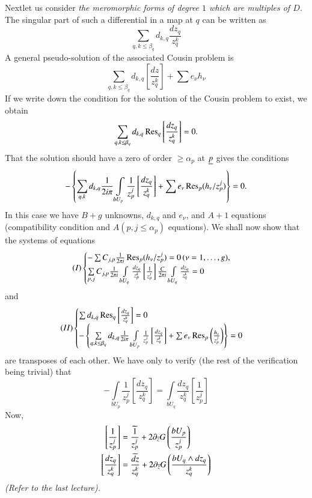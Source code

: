 Next\pageoriginale let us consider {\em the meromorphic forms of
  degree $1$ which are multiples of $D$.} The singular part of such a
differential in a map at $q$ can be written as
$$
\sum_{q,k\leq \beta_{q}}d_{k,q}\frac{dz_{q}}{z^{k}_{q}}
$$
A general pseudo-solution of the associated Cousin problem is
$$
\sum_{q,k\leq \beta_{q}}d_{k,q}\left[\frac{dz}{z^{k}_{q}}\right]+\sum
e_{\nu}h_{\nu} 
$$
If we write down the condition for the solution of the Cousin problem
to exist, we obtain
$$
\sum_{q,k\leq
  \beta_{q}}d_{k,q}\operatorname{Res}_{q}\left[\frac{dz_{q}}{z^{k}_{q}}\right]=0. 
$$
That the solution should have a zero of order $\geq \alpha_{p}$ at
$\underline{p}$ gives the conditions
$$
-\left\{\sum_{q,k}d_{k,q}\frac{1}{2i\pi}\int\limits_{bU_{p}}\frac{1}{z^{j}_{p}}\left[\frac{dz_{q}}{z^{k}_{q}}\right]+\sum
e_{\nu}\operatorname{Res}_{p}(h_{\nu}/z^{j}_{p})\right\}=0. 
$$
In this case we have $B+g$ unknowns, $d_{k,q}$ and $e_{\nu}$, and
$A+1$ equations (compatibility condition and $A(p,j\leq \alpha_{p})$
equations). We shall now show that the systems of equations 
$$
(I)
\begin{cases}
  -\sum C_{j,p}\frac{1}{2\pi
    i}\operatorname{Res}_{p}(h_{\nu}/z^{j}_{p})=0\,(\nu=1,\ldots,g),\\
  \sum\limits_{p,j}C_{j,p}\frac{1}{2\pi i} \int\limits_{bU_{q}}
  \frac{dz_{q}}{z^{k}_{p}} 
  \left[\frac{1}{z^{j}_{p}}\right]\frac{C}{2\pi i} 
  \int\limits_{bU_{q}}\frac{dz_{q}}{z^{k}_{q}}=0
\end{cases}
$$\pageoriginale
and
$$
(II)
\begin{cases}
\sum d_{k,q}\operatorname{Res}_{q}\left[\frac{dz_{q}}{z^{k}_{q}}\right]=0\\
-\left\{\sum\limits_{q,k\leq
  \beta_{q}}d_{k,q}\frac{1}{2i\pi}\int\limits_{bU_{p}}\frac{1}{z^{j}_{p}}
\left[\frac{dz_{q}}{z^{k}_{q}}\right]+\sum
  e_{\nu}\operatorname{Res}_{p}\left(\frac{h_{\nu}}{z^{j}_{p}}\right)\right\}=0 
\end{cases}
$$
are transposes of each other. We have only to verify (the rest of the
verification being trivial) that
$$
-\int\limits_{bU_{p}}\frac{1}{z^{j}_{p}}\left[\frac{dz_{q}}{z^{k}_{q}}\right]=\int\limits_{bU_{q}}\frac{dz_{q}}{z^{k}_{q}}\left[\frac{1}{z^{j}_{p}}\right] 
$$
Now,
\begin{align*}
\left[\frac{1}{z^{j}_{p}}\right] &=
\frac{\widetilde{1}}{z^{j}_{p}}+2\partial_{\overline{z}}G\left(\frac{bU_{p}}{z^{j}_{p}}\right)\\ 
\left[\frac{dz_{q}}{z^{k}_{q}}\right] &=
\frac{\widetilde{dz}}{z^{k}_{q}}+2\partial_{\overline{z}}G\left(\frac{bU_{q}\wedge
  dz_{q}}{z^{k}_{q}}\right) 
\end{align*}
{\em (Refer to the last lecture).}

